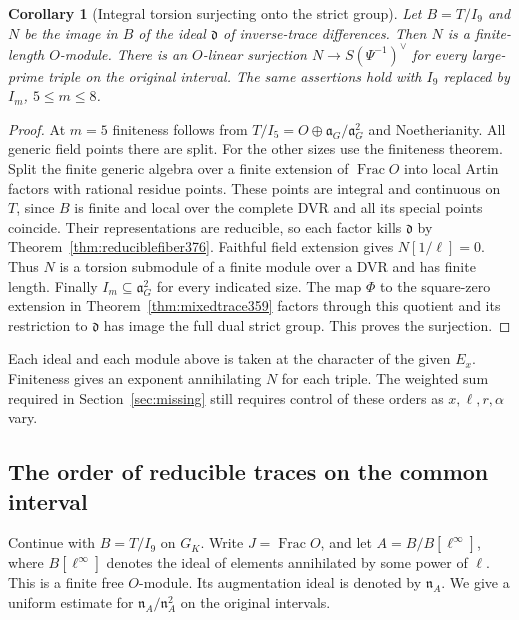 \documentclass[a4paper,11pt]{article}
\newtheorem{corollary}[proposition]{Corollary}
\theoremstyle{definition}
\theoremstyle{remark}
\numberwithin{equation}{section}
\begin{document}
\begin{corollary}[Integral torsion surjecting onto the strict group]
\label{cor:torsionimage378}
Let \(B=T/I_9\) and \(N\) be the image in \(B\) of the ideal
\(\mathfrak d\) of inverse-trace differences. Then \(N\) is
a finite-length \(O\)-module. There is an \(O\)-linear
surjection \(N\to S(\Psi^{-1})^\vee\) for every large-prime
triple on the original interval. The same assertions hold
with \(I_9\) replaced by \(I_m\), \(5\le m\le8\).
\end{corollary}
\begin{proof}
At \(m=5\) finiteness follows from
\(T/I_5=O\oplus\mathfrak a_G/\mathfrak a_G^2\) and
Noetherianity. All generic field points there are split.
For the other sizes use the finiteness theorem. Split the
finite generic algebra over a finite extension of
\(\operatorname{Frac}O\) into local Artin factors with
rational residue points. These points are integral and
continuous on \(T\), since \(B\) is finite and local over
the complete DVR and all its special points coincide.
Their representations are reducible, so each factor kills
\(\mathfrak d\) by Theorem~\ref{thm:reduciblefiber376}.
Faithful field extension gives \(N[1/\ell]=0\). Thus \(N\)
is a torsion submodule of a finite module over a DVR and
has finite length. Finally \(I_m\subseteq\mathfrak a_G^2\)
for every indicated size. The map \(\Phi\) to the square-zero
extension in Theorem~\ref{thm:mixedtrace359} factors through
this quotient and its restriction to \(\mathfrak d\) has
image the full dual strict group. This proves the surjection.
\end{proof}

Each ideal and each module above is taken at the character
of the given \(E_x\). Finiteness gives an exponent annihilating
\(N\) for each triple. The weighted sum required in
Section~\ref{sec:missing} still requires control of these
orders as \(x,\ell,r,\alpha\) vary.


\subsection{The order of reducible traces on the common interval}
\label{sec:reducibleorder379}

Continue with \(B=T/I_9\) on \(G_K\). Write \(J=\operatorname{Frac}O\),
and let \(A=B/B[\ell^\infty]\), where \(B[\ell^\infty]\) denotes
the ideal of elements annihilated by some power of \(\ell\).
This is a finite free \(O\)-module. Its augmentation ideal
is denoted by \(\mathfrak n_A\). We give a uniform estimate for
\(\mathfrak n_A/\mathfrak n_A^2\) on the original intervals.
\end{document}
